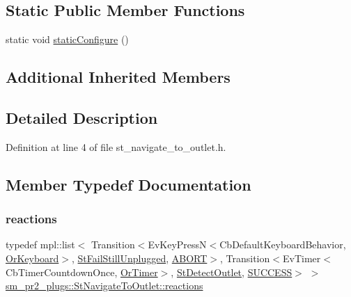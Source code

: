 \subsection*{Static Public Member Functions}
\begin{DoxyCompactItemize}
\item 
static void \hyperlink{structsm__pr2__plugs_1_1StNavigateToOutlet_a2dbe242376149d872ee92006b378ebf9}{static\+Configure} ()
\end{DoxyCompactItemize}
\subsection*{Additional Inherited Members}


\subsection{Detailed Description}


Definition at line 4 of file st\+\_\+navigate\+\_\+to\+\_\+outlet.\+h.



\subsection{Member Typedef Documentation}
\mbox{\label{structsm__pr2__plugs_1_1StNavigateToOutlet_a4b5b4d30a2a64c438e9a4d89016fc052}} 
\subsubsection{\texorpdfstring{reactions}{reactions}}
{\footnotesize\ttfamily typedef mpl\+::list$<$ Transition$<$Ev\+Key\+PressN$<$Cb\+Default\+Keyboard\+Behavior, \hyperlink{classsm__pr2__plugs_1_1OrKeyboard}{Or\+Keyboard}$>$, \hyperlink{structsm__pr2__plugs_1_1StFailStillUnplugged}{St\+Fail\+Still\+Unplugged}, \hyperlink{classABORT}{A\+B\+O\+RT}$>$, Transition$<$Ev\+Timer$<$Cb\+Timer\+Countdown\+Once, \hyperlink{classsm__pr2__plugs_1_1OrTimer}{Or\+Timer}$>$, \hyperlink{structsm__pr2__plugs_1_1StDetectOutlet}{St\+Detect\+Outlet}, \hyperlink{classSUCCESS}{S\+U\+C\+C\+E\+SS}$>$ $>$ \hyperlink{structsm__pr2__plugs_1_1StNavigateToOutlet_a4b5b4d30a2a64c438e9a4d89016fc052}{sm\+\_\+pr2\+\_\+plugs\+::\+St\+Navigate\+To\+Outlet\+::reactions}}




